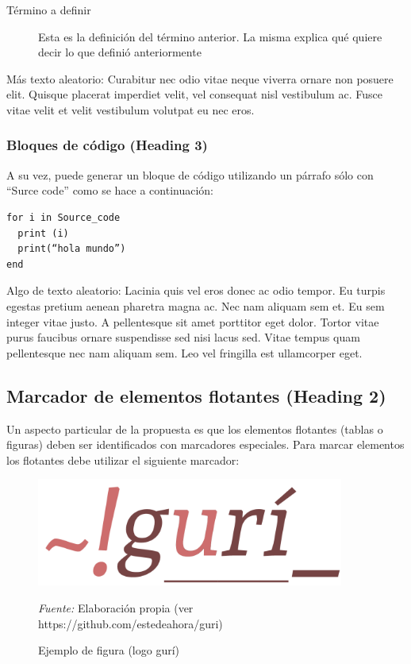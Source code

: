 \documentclass[
    a4paper,%
    DIV=calc,%
    abstract=true%
  ]{scrartcl}%
\newcommand{\source}[1]{\vspace{-9pt}\caption*{\footnotesize{\textit{Fuente:} {#1}}}}
\begin{document}
  \begin{description}
  \item[Término a definir]
  Esta es la definición del término anterior. La misma explica qué
  quiere decir lo que definió anteriormente
  \end{description}

  Más texto aleatorio: Curabitur nec odio vitae neque viverra ornare non
  posuere elit. Quisque placerat imperdiet velit, vel consequat nisl
  vestibulum ac. Fusce vitae velit et velit vestibulum volutpat eu nec
  eros.

  \subsubsection{Bloques de código (Heading
  3)}\label{bloques-de-cuxf3digo-heading-3}

  A su vez, puede generar un bloque de código utilizando un párrafo sólo
  con ``Surce code'' como se hace a continuación:

\begin{verbatim}
for i in Source_code
  print (i)
  print(“hola mundo”)
end
\end{verbatim}

  Algo de texto aleatorio: Lacinia quis vel eros donec ac odio tempor.
  Eu turpis egestas pretium aenean pharetra magna ac. Nec nam aliquam
  sem et. Eu sem integer vitae justo. A pellentesque sit amet porttitor
  eget dolor. Tortor vitae purus faucibus ornare suspendisse sed nisi
  lacus sed. Vitae tempus quam pellentesque nec nam aliquam sem. Leo vel
  fringilla est ullamcorper eget.

  \subsection{Marcador de elementos flotantes (Heading
  2)}\label{marcador-de-elementos-flotantes-heading-2}

  Un aspecto particular de la propuesta es que los elementos flotantes
  (tablas o figuras) deben ser identificados con marcadores especiales.
  Para marcar elementos los flotantes debe utilizar el siguiente
  marcador:

  \begin{figure}
  \centering
  \includegraphics[width=0.9\textwidth]{./float/FIG_02}
  \caption{Ejemplo de figura (logo gurí)}
  \source{Elaboración propia (ver https://github.com/estedeahora/guri)}
  \label{FIG_02}
  \end{figure}
\end{document}
